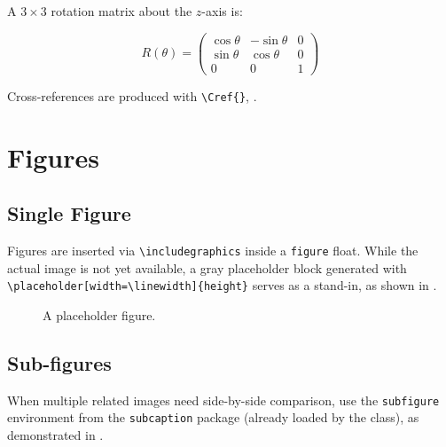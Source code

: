 \documentclass[opendfm]{xlance/xlance}
\begin{document}
A $3 \times 3$ rotation matrix about the $z$-axis is:

\begin{equation}
    R(\theta) =
    \begin{pmatrix}
        \cos\theta & -\sin\theta & 0 \\
        \sin\theta &  \cos\theta & 0 \\
        0          &  0          & 1
    \end{pmatrix}
    \label{eq:rotation}
\end{equation}

Cross-references are produced with \verb|\Cref{}|, \eg {}.



\section{Figures}
\label{section:figures}

\subsection{Single Figure}

Figures are inserted via \verb|\includegraphics| inside a \texttt{figure} float. While the actual image is not yet available, a gray placeholder block generated with \verb|\placeholder[width=\linewidth]{height}| serves as a stand-in, as shown in .

\begin{figure}[H]
    \centering
    \placeholder[0.72\linewidth]{5.5cm}
    \caption{A placeholder figure.}
    \label{fig:placeholder}
\end{figure}

\subsection{Sub-figures}

When multiple related images need side-by-side comparison, use the \texttt{subfigure} environment from the \texttt{subcaption} package (already loaded by the class), as demonstrated in .
\end{document}
